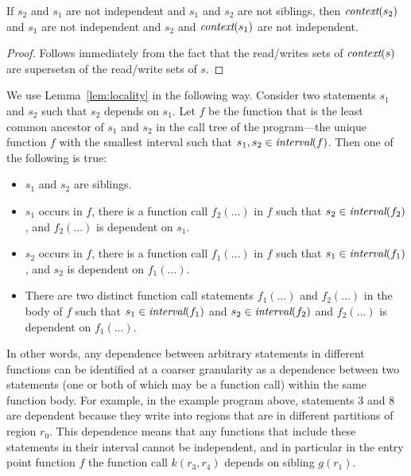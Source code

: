 \begin{lemma}
\rm
\label{lem:locality}
If $s_2$ and $s_1$ are not independent and $s_1$ and $s_2$ are not siblings, then $\mbox{\em context}(s_2)$ and $s_1$ are not independent
and $s_2$ and $\mbox{\em context}(s_1)$ are not independent.
\end{lemma}
\begin{proof}
Follows immediately from the fact that the read/writes sets of $\mbox{\em context}(s)$ are supersetsn of the read/write sets of $s$.
\end{proof}
We use Lemma~\ref{lem:locality} in the following way.  Consider two
statements $s_1$ and $s_2$ such that $s_2$ depends on $s_1$.  Let $f$ be the function that is the least
common ancestor of $s_1$ and $s_2$ in the call tree of the
program---the unique function $f$ with the smallest interval such that
$s_1,s_2 \in \mbox{\em interval}(f)$.  Then one of the following is true:
\begin{itemize}
\item $s_1$ and $s_2$ are siblings.

\item $s_1$ occurs in $f$, there is a function call $f_2(\ldots)$ in $f$ such that $s_2 \in \mbox{\em interval}(f_2)$, and $f_2(\ldots)$
is dependent on $s_1$.

\item $s_2$ occurs in $f$, there is a function call $f_1(\ldots)$ in $f$ such that $s_1 \in \mbox{\em interval}(f_1)$, and
$s_2$ is dependent on $f_1(\ldots)$.

\item There are two distinct function call statements $f_1(\ldots)$ and $f_2(\ldots)$ in the body of $f$ such
that $s_1 \in \mbox{\em interval}(f_1)$ and $s_2 \in \mbox{\em interval}(f_2)$ and $f_2(\ldots)$ is dependent on $f_1(\ldots)$.
\end{itemize}
In other words, any dependence between arbitrary statements
in different functions can be identified at a coarser granularity as a
dependence between two statements (one or both of which may be a function call) within the same function body.  For
example, in the example program above, statements 3 and 8 are
dependent because they write into regions that are in different
partitions of region $r_0$.  This dependence means that any functions
that include these statements in their interval cannot be independent,
and in particular in the entry point function $f$ the function call
$k(r_3,r_4)$ depends on sibling $g(r_1)$.

